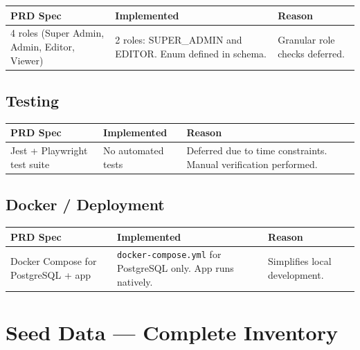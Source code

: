\documentclass[12pt,a4paper]{article}
\begin{document}
\begin{center}
\begin{tabular}{p{4cm}p{4cm}p{5cm}}
\toprule
\textbf{PRD Spec} & \textbf{Implemented} & \textbf{Reason} \\
\midrule
4 roles (Super Admin, Admin, Editor, Viewer) & 2 roles: SUPER\_ADMIN and EDITOR. Enum defined in schema. & Granular role checks deferred. \\
\bottomrule
\end{tabular}
\end{center}

\subsection{Testing}

\begin{center}
\begin{tabular}{p{4cm}p{4cm}p{5cm}}
\toprule
\textbf{PRD Spec} & \textbf{Implemented} & \textbf{Reason} \\
\midrule
Jest + Playwright test suite & No automated tests & Deferred due to time constraints. Manual verification performed. \\
\bottomrule
\end{tabular}
\end{center}

\subsection{Docker / Deployment}

\begin{center}
\begin{tabular}{p{4cm}p{4cm}p{5cm}}
\toprule
\textbf{PRD Spec} & \textbf{Implemented} & \textbf{Reason} \\
\midrule
Docker Compose for PostgreSQL + app & \texttt{docker-compose.yml} for PostgreSQL only. App runs natively. & Simplifies local development. \\
\bottomrule
\end{tabular}
\end{center}

\newpage

\section{Seed Data — Complete Inventory}
\end{document}

